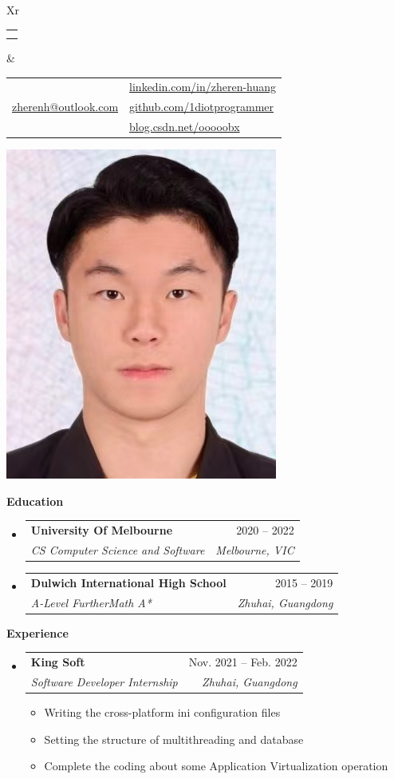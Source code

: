 \documentclass[letterpaper,12pt]{article}[leftmargin=*]
\makeatletter
\def \fullname {Zheren Huang}
\def \subtitle {}
\def \linkedinicon {\faLinkedin}
\def \linkedinlink {https://linkedin.com/in/zheren-huang-9133a6235/}
\def \linkedintext {linkedin.com/in/zheren-huang}
\def \phoneicon {\faPhone}
\def \phonetext {+61 466641756}
\def \emailicon {\faEnvelope}
\def \emaillink {mailto:zherenh@outlook.com}
\def \emailtext {zherenh@outlook.com}
\def \githubicon {\faGithub}
\def \githublink {https://github.com/1diotprogrammer}
\def \githubtext {github.com/1diotprogrammer}
\def \websiteicon {\faGlobe}
\def \websitelink {https://blog.csdn.net/ooooobx?spm=1000.2115.3001.5343}
\def \websitetext {blog.csdn.net/ooooobx}
\def \headertype {\doublecol}
\def \entryspacing {-0pt}
\def \linkedin {\linkedinicon \hspace{3pt}\href{\linkedinlink}{\linkedintext}}
\def \phone {\phoneicon \hspace{3pt}{ \phonetext}}
\def \email {\emailicon \hspace{3pt}\href{\emaillink}{\emailtext}}
\def \github {\githubicon \hspace{3pt}\href{\githublink}{\githubtext}}
\def \website {\websiteicon \hspace{3pt}\href{\websitelink}{\websitetext}}
\renewcommand{\section}[2]{\vspace{5pt}
  \colorbox{secondary}{\color{white}\raggedbottom\normalsize\textbf{{#1}{\hspace{7pt}#2}}}
}
\newcommand{\resumeEntryStart}{\begin{itemize}[leftmargin=2.5mm]}
\newcommand{\resumeEntryEnd}{\end{itemize}\vspace{\entryspacing}}
\newcommand{\resumeItemListStart}{\begin{itemize}[leftmargin=4.5mm]}
\newcommand{\resumeItemListEnd}{\end{itemize}}
\newcommand{\resumeItem}[1]{
  \item\small{
    {#1 \vspace{-2pt}}
  }
}
\newcommand{\resumeEntryTSDL}[4]{
  \vspace{-1pt}\item[]
    \begin{tabularx}{0.97\textwidth}{X@{\hspace{60pt}}r}
      \textbf{\color{primary}#1} & {\firabook\color{accent}\small#2} \\
      \textit{\color{accent}\small#3} & \textit{\color{accent}\small#4} \\
    \end{tabularx}\vspace{-6pt}
}
\newcommand{\doublecol}[6]{
  \begin{tabularx}{\textwidth}{Xr}
    {
      \begin{tabular}[c]{l}
        \fontsize{35}{45}\selectfont{\color{primary}{{\textbf{\fullname}}}} \\
        {\textit{\subtitle}} 
      \end{tabular}
    } & {
      \begin{tabular}[c]{l@{\hspace{1.5em}}l}
        {\small#4} & {\small#1} \\
        {\small#5} & {\small#2} \\
        {\small#6} & {\small#3}
      \end{tabular}
    }
  \end{tabularx}
}
\makeatother
\begin{document}
\headertype{\linkedin}{\github}{\website}{\phone}{\email}{} 
\vspace{-10pt}  

  \includegraphics[scale=0.4]{ID_Photo.jpg}

\section{\faGraduationCap}{Education}

  \resumeEntryStart
    \resumeEntryTSDL
      {University Of Melbourne}{2020 -- 2022}
      {CS Computer Science and Software}{Melbourne, VIC}
  \resumeEntryEnd
  
  \resumeEntryStart
    \resumeEntryTSDL
      {Dulwich International High School}{2015 -- 2019}
      {A-Level FurtherMath A*}{Zhuhai, Guangdong}
  \resumeEntryEnd


\section{\faPieChart}{Experience}

  \resumeEntryStart
    \resumeEntryTSDL
      {King Soft}{Nov. 2021 -- Feb. 2022}
      {Software Developer Internship}{Zhuhai, Guangdong}
    \resumeItemListStart
      \resumeItem {Writing the cross-platform ini configuration files}
      \resumeItem {Setting the structure of multithreading and database}
      \resumeItem {Complete the coding about some Application Virtualization operation}
    \resumeItemListEnd
  \resumeEntryEnd
  
\end{document}
